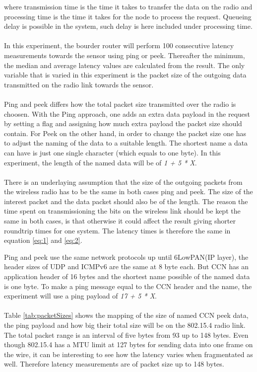 where transmission time is the time it takes to transfer the data on the radio and processing time is the time it takes for the node to process the request. Queueing delay is possible in the system, such delay is here included under processing time.
\\\\
In this experiment, the bourder router will perform 100 consecutive latency measurements towards the sensor using ping or peek. Thereafter the minimum, the median and average latency values are calculated from the result.  
The only variable that is varied in this experiment is the packet size of the outgoing data transmitted on the radio link towards the sensor.
\\\\
Ping and peek differs how the total packet size transmitted over the radio is choosen. With the Ping approach, one adds an extra data payload in the request by setting a flag and assigning how much extra payload the packet size should contain. For Peek on the other hand, in order to change the packet size one has to adjust the naming of the data to a suitable length. The shortest name a data can have is just one single character (which equals to one byte). In this experiment, the length of the named data will be of \textit{1 + 5 * X}.
\\\\
There is an underlaying assumption that the size of the outgoing packets from the wireless radio has to be the same in both cases ping and peek. The size of the interest packet and the data packet should also be of the length. The reason the time spent on transmissioning the bits on the wireless link should be kept the same in both cases, is that otherwise it could affect the result giving shorter roundtrip times for one system. The latency times is therefore the same in equation \ref{eq:1} and \ref{eq:2}. 


Ping and peek use the same network protocols up until 6LowPAN(IP layer), the header sizes of UDP and ICMPv6 are the same at 8 byte each. But CCN has an application header of 16 bytes and the shortest name possible of the named data is one byte. To make a ping message equal to the CCN header and the name, the experiment will use a ping payload of \textit{17 + 5 * X}. 
\\\\Table \ref{tab:packetSizes} shows the mapping of the size of named CCN peek data, the ping payload and how big their total size will be on the 802.15.4 radio link. The total packet range is an interval of five bytes from 93 up to 148 bytes. 
Even though 802.15.4 has a MTU limit at 127 bytes for sending data into one frame on the wire, it can be interesting to see how the latency varies when fragmentated as well. Therefore latency measurements are of packet size up to 148 bytes.

